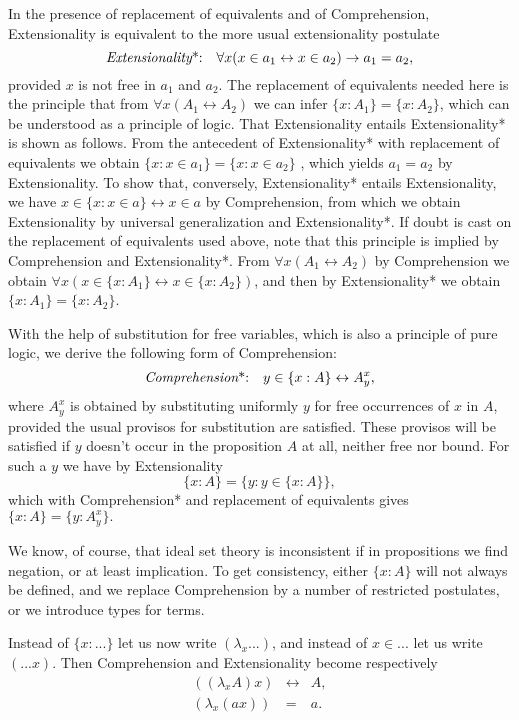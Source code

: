\documentclass[12pt]{article}
\begin{document}
In the presence of replacement of equivalents and of Comprehension,
Extensionality is equivalent to the more usual extensionality postulate 
\[
\text{{\it Extensionality}*:\quad }\forall x(x\in a_{1}\leftrightarrow x\in
a_{2})\rightarrow a_{1}=a_{2}, 
\]
provided $x$ is not free in $a_{1}$ and $a_{2}$. The replacement of
equivalents needed here is the principle that from $\forall
x(A_{1}\leftrightarrow A_{2})$ we can infer $\{x:A_{1}\}=\{x:A_{2}\}$, which
can be understood as a principle of logic. That Extensionality entails
Extensionality* is shown as follows. From the antecedent of Extensionality*
with replacement of equivalents we obtain $\{x:x\in a_{1}\}=\{x:x\in a_{2}\}$%
, which yields $a_{1}=a_{2}$ by Extensionality. To show that, conversely,
Extensionality* entails Extensionality, we have $x\in \{x:x\in
a\}\leftrightarrow x\in a$ by Comprehension, from which we obtain
Extensionality by universal generalization and Extensionality*. If doubt is
cast on the replacement of equivalents used above, note that this principle
is implied by Comprehension and Extensionality*. From $\forall
x(A_{1}\leftrightarrow A_{2})$ by Comprehension we obtain $\forall x(x\in
\{x:A_{1}\}\leftrightarrow x\in \{x:A_{2}\})$, and then by Extensionality*
we obtain $\{x:A_{1}\}=\{x:A_{2}\}$.

With the help of substitution for free variables, which is also a principle
of pure logic, we derive the following form of Comprehension: 
\[
\text{{\it Comprehension}*:\quad }y\in \{x:A\}\leftrightarrow A_{y}^{x}, 
\]
where $A_{y}^{x}$ is obtained by substituting uniformly $y$ for free
occurrences of $x$ in $A$, provided the usual provisos for substitution are
satisfied. These provisos will be satisfied if $y$ doesn't occur in the
proposition $A$ at all, neither free nor bound. For such a $y$ we have by
Extensionality 
\[
\{x:A\}=\{y:y\in \{x:A\}\}, 
\]
which with Comprehension* and replacement of equivalents gives $%
\{x:A\}=\{y:A_{y}^{x}\}.$

We know, of course, that ideal set theory is inconsistent if in propositions
we find negation, or at least implication. To get consistency, either $%
\{x:A\}$ will not always be defined, and we replace Comprehension by a
number of restricted postulates, or we introduce types for terms.

Instead of $\{x:...\}$ let us now write $(\lambda _{x}...)$, and instead of $%
x\in ...$ let us write $(...x)$. Then Comprehension and Extensionality
become respectively 
\begin{eqnarray*}
((\lambda _{x}A)x) &\leftrightarrow &A, \\
(\lambda _{x}(ax)) &=&a.
\end{eqnarray*}
\end{document}
